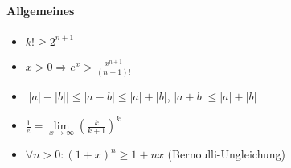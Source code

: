 \documentclass[paper=a3,paper=landscape, fontsize=9pt, DIV=30]{scrartcl}
\begin{document}
\begin{multicols*}{4}
	\paragraph{Allgemeines}
		\begin{itemize}
			\item $k! \geq 2^{n+1}$
			\item $x>0 \Rightarrow e^x > \frac{x^{n+1}}{(n+1)!}$
			\item $\lvert \lvert a \rvert- \lvert b \rvert \rvert \leq \lvert a-b \rvert \leq \lvert a \rvert + \lvert b \rvert$, $\lvert a+b \rvert \leq \lvert a \rvert + \lvert b \rvert$
			\item $\frac{1}{e} = \lim\limits_{x \rightarrow \infty} (\frac{k}{k+1})^k$
			\item $\forall n > 0: (1+x)^n \geq 1+nx$ (Bernoulli-Ungleichung)
		\end{itemize}
\end{multicols*}
\end{document}

